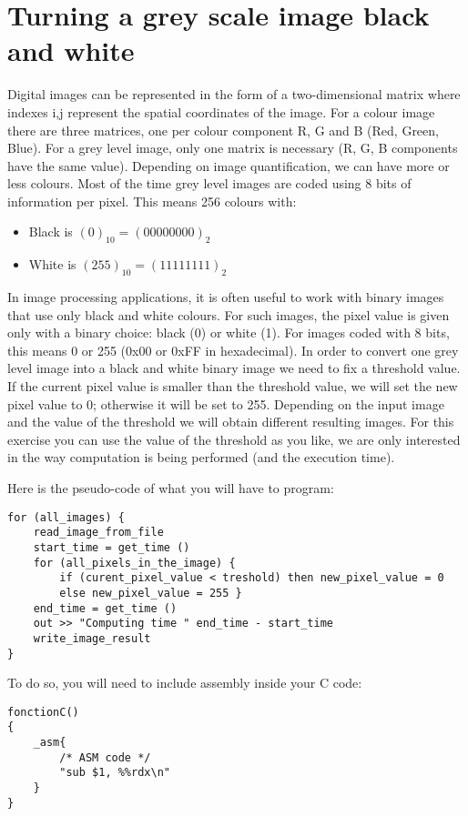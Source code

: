 \documentclass[10pt,a4paper]{article}
\theoremstyle{definition}%
\begin{document}
\section*{Turning a grey scale image black and white}
Digital images can be represented in the form of a two-dimensional matrix where indexes i,j represent the spatial coordinates of the image.
For a colour image there are three matrices, one per colour component R, G and B (Red, Green, Blue).
For a grey level image, only one matrix is necessary (R, G, B components have the same value).
Depending on image quantification, we can have more or less colours.
Most of the time grey level images are coded using 8 bits of information per pixel.
This means 256 colours with:
\begin{itemize}
	\item Black is $(0)_{10} = (00000000)_2$
	\item White is $(255)_{10} = (11111111)_2$
\end{itemize}

In image processing applications, it is often useful to work with binary images that use only black and white colours.
For such images, the pixel value is given only with a binary choice: black (0) or white (1).
For images coded with 8 bits, this means 0 or 255 (0x00 or 0xFF in hexadecimal).
In order to convert one grey level image into a black and white binary image we need to fix a threshold value.
If the current pixel value is smaller than the threshold value, we will set the new pixel value to 0; otherwise it will be set to 255.
Depending on the input image and the value of the threshold we will obtain different resulting images.
For this exercise you can use the value of the threshold as you like, we are only interested in the way computation is being performed (and the execution time).

Here is the pseudo-code of what you will have to program:
\begin{verbatim}
for (all_images) {
	read_image_from_file
	start_time = get_time ()
	for (all_pixels_in_the_image) {
		if (curent_pixel_value < treshold) then new_pixel_value = 0
		else new_pixel_value = 255 }
	end_time = get_time ()
	out >> "Computing time " end_time - start_time
	write_image_result
}
\end{verbatim}

To do so, you will need to include assembly inside your C code:

\begin{verbatim}
fonctionC()
{
	_asm{
		/* ASM code */
		"sub $1, %%rdx\n"
	}
}
\end{verbatim}
\end{document}

